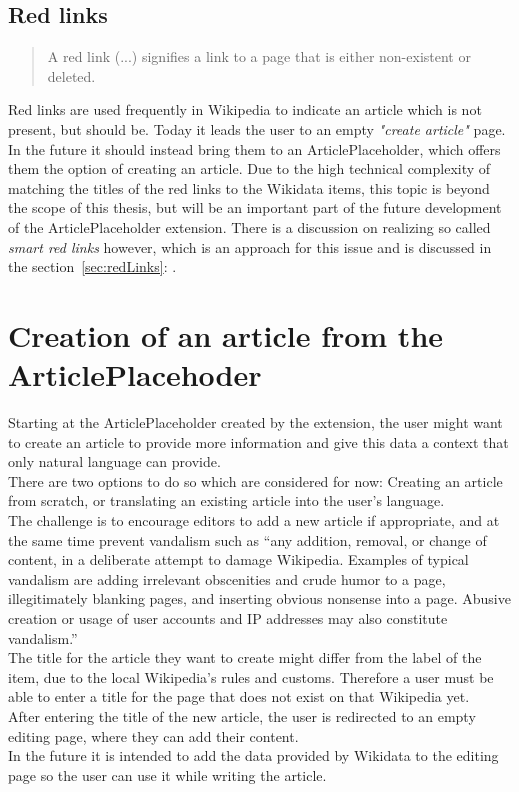 \subsection{Red links}
\begin{quotation}
A red link (...) signifies a link to a page that is either non-existent or deleted. 
\end{quotation} \citep{wiki:01}

Red links are used frequently in Wikipedia to indicate an article which is not present, but should be. Today it leads the user to an empty \textit{"create article"} page. In the future it should instead bring them to an ArticlePlaceholder, which offers them the option of creating an article. Due to the high technical complexity of matching the titles of the red links to the Wikidata items, this topic is beyond the scope of this thesis, but will be an important part of the future development of the ArticlePlaceholder extension. There is a discussion on realizing so called \textit{smart red links} however, which is an approach for this issue and is discussed in the section~\ref{sec:redLinks}: .

\section{Creation of an article from the ArticlePlacehoder}
Starting at the ArticlePlaceholder created by the extension, the user might want to create an article to provide more information and give this data a context that only natural language can provide. \\
There are two options to do so which are considered for now: Creating an article from scratch, or translating an existing article into the user's language. \\
The challenge is to encourage editors to add a new article if appropriate, and at the same time prevent vandalism such as ``any addition, removal, or change of content, in a deliberate attempt to damage Wikipedia. Examples of typical vandalism are adding irrelevant obscenities and crude humor to a page, illegitimately blanking pages, and inserting obvious nonsense into a page. Abusive creation or usage of user accounts and IP addresses may also constitute vandalism.'' \citep{wiki:33} \\ 
The title for the article they want to create might differ from the label of the item, due to the local Wikipedia's rules and customs. Therefore a user must be able to enter a title for the page that does not exist on that Wikipedia yet. \\
After entering the title of the new article, the user is redirected to an empty editing page, where they can add their content. \\
In the future it is intended to add the data provided by Wikidata to the editing page so the user can use it while writing the article. 

